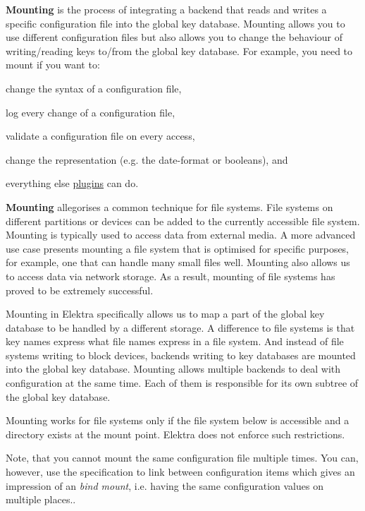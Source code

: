 {\bfseries Mounting} is the process of integrating a backend that reads and writes a specific configuration file into the global key database. Mounting allows you to use different configuration files but also allows you to change the behaviour of writing/reading keys to/from the global key database. For example, you need to mount if you want to\+:


\begin{DoxyItemize}
\item change the syntax of a configuration file,
\item log every change of a configuration file,
\item validate a configuration file on every access,
\item change the representation (e.\+g. the date-\/format or booleans), and
\item everything else \hyperlink{md_src_plugins_README_src_plugins_README_md}{plugins} can do.
\end{DoxyItemize}

{\bfseries Mounting} allegorises a common technique for file systems. File systems on different partitions or devices can be added to the currently accessible file system. Mounting is typically used to access data from external media. A more advanced use case presents mounting a file system that is optimised for specific purposes, for example, one that can handle many small files well. Mounting also allows us to access data via network storage. As a result, mounting of file systems has proved to be extremely successful.

Mounting in Elektra specifically allows us to map a part of the global key database to be handled by a different storage. A difference to file systems is that key names express what file names express in a file system. And instead of file systems writing to block devices, backends writing to key databases are mounted into the global key database. Mounting allows multiple backends to deal with configuration at the same time. Each of them is responsible for its own subtree of the global key database.

Mounting works for file systems only if the file system below is accessible and a directory exists at the mount point. Elektra does not enforce such restrictions.

Note, that you cannot mount the same configuration file multiple times. You can, however, use the specification to link between configuration items which gives an impression of an {\itshape bind mount}, i.\+e. having the same configuration values on multiple places..


